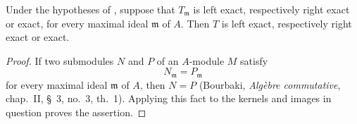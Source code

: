 \begin{proposition}[7.1.5]
\label{III.7.1.5}
Under the hypotheses of , suppose that
$T_{\mathfrak m}$ is left exact, respectively right exact or
exact, for every maximal ideal $\mathfrak m$ of $A$.  Then $T$
is left exact, respectively right exact or exact.
\end{proposition}

\begin{proof}
If two submodules $N$ and $P$ of an $A$-module $M$ satisfy
\[
  N_{\mathfrak m}=P_{\mathfrak m}
\]
for every maximal ideal $\mathfrak m$ of $A$, then $N=P$
(Bourbaki, \emph{Alg\`ebre commutative}, chap.~II, \S~3,
no.~3, th.~1).  Applying this fact to the kernels and images in
question proves the assertion.
\end{proof}


\ifdefined\EGAIIIStopAfterPageOneSevenNine
  \expandafter\endinput
\fi




\ifdefined\EGAIIIStopAfterPageOneEightNine
  \expandafter\endinput
\fi






\ifdefined\EGAIIIStopAfterPageOneNineNine
  \expandafter\endinput
\fi

\ifdefined\EGAIIIStopAfterPageTwoZeroEight
  \expandafter\endinput
\fi









